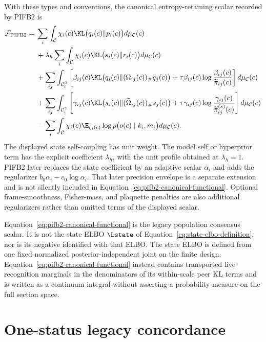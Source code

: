 With these types and conventions, the canonical entropy-retaining scalar recorded by PIFB2 is
\begin{align}
\mathcal F_{\mathrm{PIFB2}}
={}&\sum_i\int_{\mathcal C}
\chi_i(c)\KL\bigl(q_i(c)\Vert p_i(c)\bigr)d\mu_{\mathcal C}(c)
\label{eq:pifb2-canonical-functional}\\
&+\lambda_h\sum_i\int_{\mathcal C}
\chi_i(c)\KL\bigl(s_i(c)\Vert r_i(c)\bigr)d\mu_{\mathcal C}(c)\notag\\
&+\sum_{ij}\int_{\mathcal C_i^{\beta}}\left[
\beta_{ij}(c)\KL\bigl(q_i(c)\Vert(\Omega_{ij}(c))_{\#}q_j(c)\bigr)
+\tau\beta_{ij}(c)\log\frac{\beta_{ij}(c)}{\widetilde\pi_{ij}(c)}
\right]d\mu_{\mathcal C}(c)\notag\\
&+\sum_{ij}\int_{\mathcal C_i^{\gamma}}\left[
\gamma_{ij}(c)\KL\bigl(s_i(c)\Vert(\widetilde\Omega_{ij}(c))_{\#}s_j(c)\bigr)
+\tau\gamma_{ij}(c)\log
\frac{\gamma_{ij}(c)}{\widetilde\pi_{ij}^{(s)}(c)}
\right]d\mu_{\mathcal C}(c)\notag\\
&-\sum_i\int_{\mathcal C}\chi_i(c)
\E_{\zeta_i(c)}\log p\bigl(o(c)\mid k_i,m_i\bigr)d\mu_{\mathcal C}(c).
\notag
\end{align}
The displayed state self-coupling has unit weight. The model self or hyperprior term has the explicit coefficient \(\lambda_h\), with the unit profile obtained at \(\lambda_h=1\). PIFB2 later replaces the state coefficient by an adaptive scalar \(\alpha_i\) and adds the regularizer \(b_0\alpha_i-c_0\log\alpha_i\). That later precision envelope is a separate extension and is not silently included in Equation~\eqref{eq:pifb2-canonical-functional}. Optional frame-smoothness, Fisher-mass, and plaquette penalties are also additional regularizers rather than omitted terms of the displayed scalar.

Equation~\eqref{eq:pifb2-canonical-functional} is the legacy population consensus scalar. It is not the state ELBO \(\Lstate\) of Equation~\eqref{eq:state-elbo-definition}, nor is its negative identified with that ELBO. The state ELBO is defined from one fixed normalized posterior-independent joint on the finite design. Equation~\eqref{eq:pifb2-canonical-functional} instead contains transported live recognition marginals in the denominators of its within-scale peer KL terms and is written as a continuum integral without asserting a probability measure on the full section space.

\section{One-status legacy concordance}


